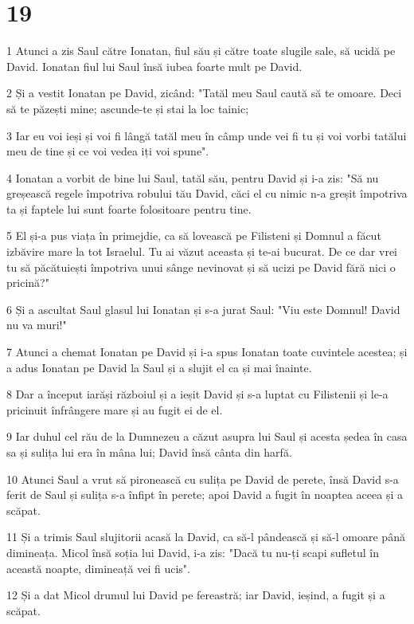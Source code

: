\chapter{19}

\par 1 Atunci a zis Saul către Ionatan, fiul său și către toate slugile sale, să ucidă pe David. Ionatan fiul lui Saul însă iubea foarte mult pe David.
\par 2 Și a vestit Ionatan pe David, zicând: "Tatăl meu Saul caută să te omoare. Deci să te păzești mine; ascunde-te și stai la loc tainic;
\par 3 Iar eu voi ieși și voi fi lângă tatăl meu în câmp unde vei fi tu și voi vorbi tatălui meu de tine și ce voi vedea iți voi spune".
\par 4 Ionatan a vorbit de bine lui Saul, tatăl său, pentru David și i-a zis: "Să nu greșească regele împotriva robului tău David, căci el cu nimic n-a greșit împotriva ta și faptele lui sunt foarte folositoare pentru tine.
\par 5 El și-a pus viața în primejdie, ca să lovească pe Filisteni și Domnul a făcut izbăvire mare la tot Israelul. Tu ai văzut aceasta și te-ai bucurat. De ce dar vrei tu să păcătuiești împotriva unui sânge nevinovat și să ucizi pe David fără nici o pricină?"
\par 6 Și a ascultat Saul glasul lui Ionatan și s-a jurat Saul: "Viu este Domnul! David nu va muri!"
\par 7 Atunci a chemat Ionatan pe David și i-a spus Ionatan toate cuvintele acestea; și a adus Ionatan pe David la Saul și a slujit el ca și mai înainte.
\par 8 Dar a început iarăși războiul și a ieșit David și s-a luptat cu Filistenii și le-a pricinuit înfrângere mare și au fugit ei de el.
\par 9 Iar duhul cel rău de la Dumnezeu a căzut asupra lui Saul și acesta ședea în casa sa și sulița lui era în mâna lui; David însă cânta din harfă.
\par 10 Atunci Saul a vrut să pironească cu sulița pe David de perete, însă David s-a ferit de Saul și sulița s-a înfipt în perete; apoi David a fugit în noaptea aceea și a scăpat.
\par 11 Și a trimis Saul slujitorii acasă la David, ca să-l pândească și să-l omoare până dimineața. Micol însă soția lui David, i-a zis: "Dacă tu nu-ți scapi sufletul în această noapte, dimineață vei fi ucis".
\par 12 Și a dat Micol drumul lui David pe fereastră; iar David, ieșind, a fugit și a scăpat.
